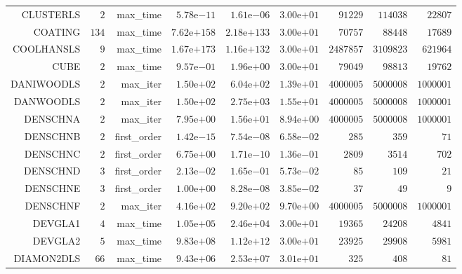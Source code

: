 \begin{longtable}{rrrrrrrrr}
CLUSTERLS & \(     2\) & max\_time & \( 5.78\)e\(-11\) & \( 1.61\)e\(-06\) & \( 3.00\)e\(+01\) & \( 91229\) & \(114038\) & \( 22807\) \\
COATING & \(   134\) & max\_time & \(7.62\)e\(+158\) & \(2.18\)e\(+133\) & \( 3.00\)e\(+01\) & \( 70757\) & \( 88448\) & \( 17689\) \\
COOLHANSLS & \(     9\) & max\_time & \(1.67\)e\(+173\) & \(1.16\)e\(+132\) & \( 3.00\)e\(+01\) & \(2487857\) & \(3109823\) & \(621964\) \\
CUBE & \(     2\) & max\_time & \( 9.57\)e\(-01\) & \( 1.96\)e\(+00\) & \( 3.00\)e\(+01\) & \( 79049\) & \( 98813\) & \( 19762\) \\
DANIWOODLS & \(     2\) & max\_iter & \( 1.50\)e\(+02\) & \( 6.04\)e\(+02\) & \( 1.39\)e\(+01\) & \(4000005\) & \(5000008\) & \(1000001\) \\
DANWOODLS & \(     2\) & max\_iter & \( 1.50\)e\(+02\) & \( 2.75\)e\(+03\) & \( 1.55\)e\(+01\) & \(4000005\) & \(5000008\) & \(1000001\) \\
DENSCHNA & \(     2\) & max\_iter & \( 7.95\)e\(+00\) & \( 1.56\)e\(+01\) & \( 8.94\)e\(+00\) & \(4000005\) & \(5000008\) & \(1000001\) \\
DENSCHNB & \(     2\) & first\_order & \( 1.42\)e\(-15\) & \( 7.54\)e\(-08\) & \( 6.58\)e\(-02\) & \(   285\) & \(   359\) & \(    71\) \\
DENSCHNC & \(     2\) & first\_order & \( 6.75\)e\(+00\) & \( 1.71\)e\(-10\) & \( 1.36\)e\(-01\) & \(  2809\) & \(  3514\) & \(   702\) \\
DENSCHND & \(     3\) & first\_order & \( 2.13\)e\(-02\) & \( 1.65\)e\(-01\) & \( 5.73\)e\(-02\) & \(    85\) & \(   109\) & \(    21\) \\
DENSCHNE & \(     3\) & first\_order & \( 1.00\)e\(+00\) & \( 8.28\)e\(-08\) & \( 3.85\)e\(-02\) & \(    37\) & \(    49\) & \(     9\) \\
DENSCHNF & \(     2\) & max\_iter & \( 4.16\)e\(+02\) & \( 9.20\)e\(+02\) & \( 9.70\)e\(+00\) & \(4000005\) & \(5000008\) & \(1000001\) \\
DEVGLA1 & \(     4\) & max\_time & \( 1.05\)e\(+05\) & \( 2.46\)e\(+04\) & \( 3.00\)e\(+01\) & \( 19365\) & \( 24208\) & \(  4841\) \\
DEVGLA2 & \(     5\) & max\_time & \( 9.83\)e\(+08\) & \( 1.12\)e\(+12\) & \( 3.00\)e\(+01\) & \( 23925\) & \( 29908\) & \(  5981\) \\
DIAMON2DLS & \(    66\) & max\_time & \( 9.43\)e\(+06\) & \( 2.53\)e\(+07\) & \( 3.01\)e\(+01\) & \(   325\) & \(   408\) & \(    81\) \\

\end{longtable}

